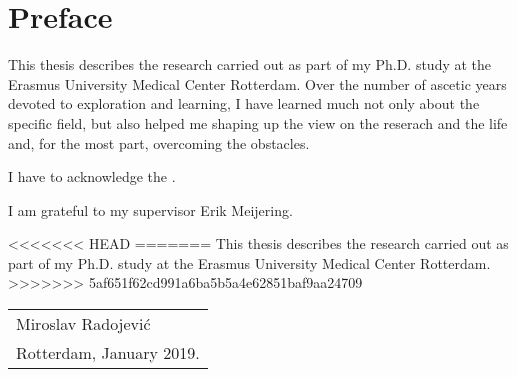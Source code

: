 %
% 

\chpos{14mm}{10mm}
\chapter*{Preface}

This thesis describes the research carried out as part of my Ph.D. study at the Erasmus University Medical Center Rotterdam. Over the number of ascetic years devoted to exploration and learning, I have learned much not only about the specific field, but also helped me shaping up the view on the reserach and the life and, for the most part, overcoming the obstacles.

I have to acknowledge the . 

I am grateful to my supervisor Erik Meijering.




<<<<<<< HEAD
=======
This thesis describes the research carried out as part of my Ph.D. study at the Erasmus University Medical Center Rotterdam.
>>>>>>> 5af651f62cd991a6ba5b5a4e62851baf9aa24709
\bigskip
\begin{flushright}
  \begin{tabular}{@{}l@{}}
    Miroslav Radojevi\'{c}\\
    Rotterdam, January 2019.
  \end{tabular}
\end{flushright}
